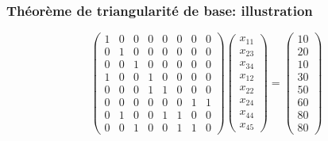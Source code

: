 \documentclass[usepdftitle=false]{beamer}
\begin{document}
\begin{frame}
\frametitle{Théorème de triangularité de base: illustration}

\[
\begin{pmatrix}
 1 & 0 & 0 & 0 & 0 & 0 & 0 & 0 \\
 0 & 1 & 0 & 0 & 0 & 0 & 0 & 0 \\
 0 & 0 & 1 & 0 & 0 & 0 & 0 & 0 \\
 1 & 0 & 0 & 1 & 0 & 0 & 0 & 0 \\
 0 & 0 & 0 & 1 & 1 & 0 & 0 & 0 \\
 0 & 0 & 0 & 0 & 0 & 0 & 1 & 1 \\
 0 & 1 & 0 & 0 & 1 & 1 & 0 & 0 \\
 0 & 0 & 1 & 0 & 0 & 1 & 1 & 0
\end{pmatrix}
\begin{pmatrix}
x_{11} \\
x_{23} \\
x_{34} \\
x_{12} \\
x_{22} \\
x_{24} \\
x_{44} \\
x_{45}
\end{pmatrix}
=
\begin{pmatrix}
10 \\
20 \\
10 \\
30 \\
50 \\
60 \\
80 \\
80
\end{pmatrix}
\]

\end{frame}
\end{document}
